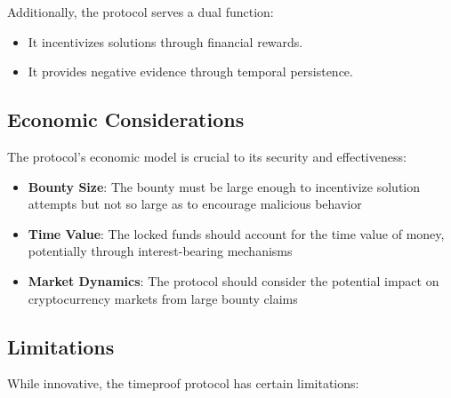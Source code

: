 \documentclass[12pt]{report}
\begin{document}
Additionally, the protocol serves a dual function:

\begin{itemize}
    \item It incentivizes solutions through financial rewards.
    \item It provides negative evidence through temporal persistence.
\end{itemize}

\subsection{Economic Considerations}
The protocol's economic model is crucial to its security and effectiveness:
\begin{itemize}
    \item \textbf{Bounty Size}: The bounty must be large enough to incentivize solution attempts but not so large as to encourage malicious behavior
    \item \textbf{Time Value}: The locked funds should account for the time value of money, potentially through interest-bearing mechanisms
    \item \textbf{Market Dynamics}: The protocol should consider the potential impact on cryptocurrency markets from large bounty claims
\end{itemize}

\subsection{Limitations}

While innovative, the timeproof protocol has certain limitations:
\end{document}
